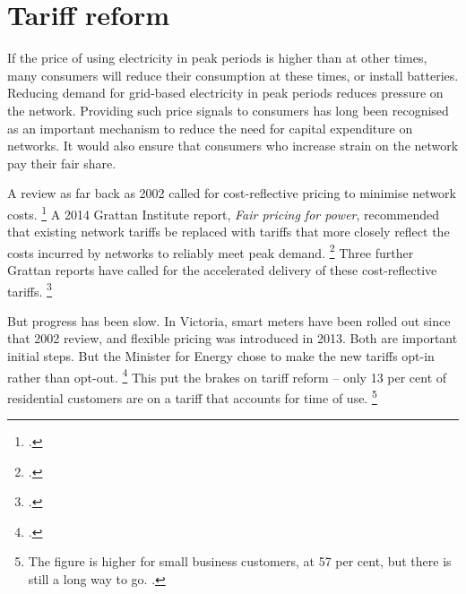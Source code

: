\documentclass[FrontPage]{grattan}
\begin{document}

\section{Tariff reform}\label{sec:tariff-reform} 
If the price of using electricity in peak periods is higher than at other times, many consumers will reduce their consumption at these times, or install batteries. Reducing demand for grid-based electricity in peak periods reduces pressure on the network. Providing such price signals to consumers has long been recognised as an important mechanism to reduce the need for capital expenditure on networks. It would also ensure that consumers who increase strain on the network pay their fair share.

A review as far back as 2002 called for cost-reflective pricing to minimise network costs.%
\footcite[][132]{Parer2002TowardsEfficientEnergyMarket} A 2014 Grattan Institute report, \emph{Fair pricing for power}, recommended that existing network tariffs be replaced with tariffs that more closely reflect the costs incurred by networks to reliably meet peak demand.%
\footcite{WoodCarter-Fair-pricing-for-power}
Three further Grattan reports have called for the accelerated delivery of these cost-reflective tariffs.%
\footcites{WoodBlowers-2015-Sundown-sunrise}{WoodBlowers-2015-Fair-pricing-for-WA}{WoodBlowers-2017-Price-shock} 

But progress has been slow. In Victoria, smart meters have been rolled out since that 2002 review, and flexible pricing was introduced in 2013. Both are important initial steps. But the Minister for Energy chose to make the new tariffs opt-in rather than opt-out.%
\footcite{Wood2016VicTariffReform}
This put the brakes on tariff reform -- only 13 per cent of residential customers are on a tariff that accounts for time of use.%
\footnote{The figure is higher for small business customers, at 57 per cent, but there is still a long way to go. \textcite{CME2017VicTariffUptake}.}
\end{document}
